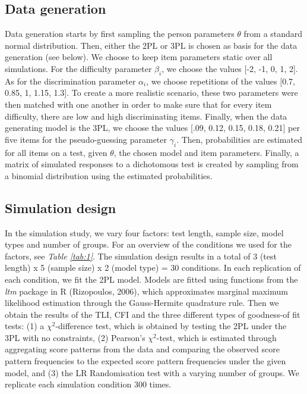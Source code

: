 \documentclass[Royal,sageapa,times,doublespace]{sagej}
\begin{document}
\subsection{Data generation}
Data generation starts by first sampling the person parameters $\theta$ from a standard normal distribution. Then, either the 2PL or 3PL is chosen as basis for the data generation (see below). We choose to keep item parameters static over all simulations. For the difficulty parameter $\beta_i$, we choose the values [-2, -1, 0, 1, 2]. As for the discrimination parameter $\alpha_i$, we choose repetitions of the values [0.7, 0.85, 1, 1.15, 1.3]. To create a more realistic scenario, these two parameters were then matched with one another in order to make sure that for every item difficulty, there are low and high discriminating items. Finally, when the data generating model is the 3PL, we choose the values [.09, 0.12, 0.15, 0.18, 0.21] per five items for the pseudo-guessing parameter $\gamma_i$. Then, probabilities are estimated for all items on a test, given $\theta$, the chosen model and item parameters. Finally, a matrix of simulated responses to a dichotomous test is created by sampling from a binomial distribution using the estimated probabilities. 
\subsection{Simulation design}
In the simulation study, we vary four factors: test length, sample size, model types and number of groups. For an overview of the conditions we used for the factors, see \textit{Table \ref{tab:1}}. The simulation design results in a total of 3 (test length) x 5 (sample size) x 2 (model type) = 30 conditions. In each replication of each condition, we fit the 2PL model. Models are fitted using functions from the \textit{ltm} package in R (Rizopoulos, 2006), which approximates marginal maximum likelihood estimation through the Gauss-Hermite quadrature rule. Then we obtain the results of the TLI, CFI and the three different types of goodness-of fit tests: (1) a $\chi^2$-difference test, which is obtained by testing the 2PL under the 3PL with no constraints, (2) Pearson's $\chi^2$-test, which is estimated through aggregating score patterns from the data and comparing the observed score pattern frequencies to the expected score pattern frequencies under the given model, and (3) the LR Randomisation test with a varying number of groups. We replicate each simulation condition 300 times.
\end{document}
